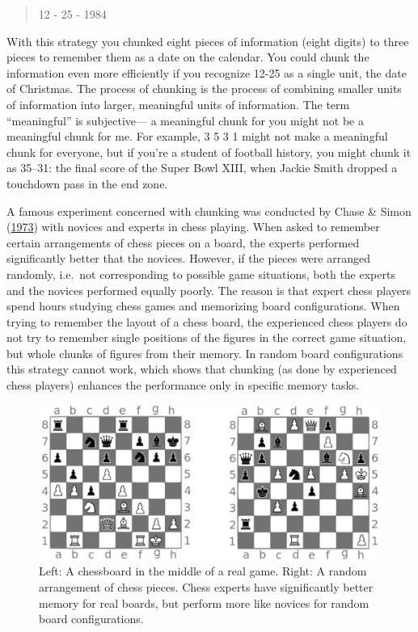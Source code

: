 \documentclass[
]{krantz}
\begin{document}
\begin{quote}
12 - 25 - 1984
\end{quote}

With this strategy you chunked eight pieces of information (eight digits) to three pieces to remember them as a date on the calendar. You could chunk the information even more efficiently if you recognize 12-25 as a single unit, the date of Christmas. The process of chunking is the process of combining smaller units of information into larger, meaningful units of information. The term ``meaningful'' is subjective--- a meaningful chunk for you might not be a meaningful chunk for me. For example, 3 5 3 1 might not make a meaningful chunk for everyone, but if you're a student of football history, you might chunk it as 35--31: the final score of the Super Bowl XIII, when Jackie Smith dropped a touchdown pass in the end zone.

A famous experiment concerned with chunking was conducted by Chase \& Simon (\protect\hyperlink{ref-Chase1973}{1973}) with novices and experts in chess playing. When asked to remember certain arrangements of chess pieces on a board, the experts performed significantly better that the novices. However, if the pieces were arranged randomly, i.e.~not corresponding to possible game situations, both the experts and the novices performed equally poorly. The reason is that expert chess players spend hours studying chess games and memorizing board configurations. When trying to remember the layout of a chess board, the experienced chess players do not try to remember single positions of the figures in the correct game situation, but whole chunks of figures from their memory. In random board configurations this strategy cannot work, which shows that chunking (as done by experienced chess players) enhances the performance only in specific memory tasks.

\begin{figure}

{\centering \includegraphics[width=0.8\linewidth]{images/ch4/chess} 

}

\caption{Left: A chessboard in the middle of a real game. Right: A random arrangement of chess pieces. Chess experts have significantly better memory for real boards, but perform more like novices for random board configurations.}\label{fig:chess}
\end{figure}
\end{document}
